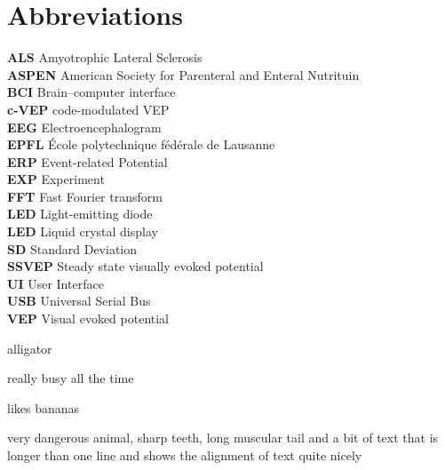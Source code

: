 \chapter{Abbreviations}
\textbf{ALS} Amyotrophic Lateral Sclerosis\\
\textbf{ASPEN}	American Society for Parenteral and Enteral Nutrituin\\
\textbf{BCI}	Brain–computer interface\\
\textbf{c-VEP}	code-modulated VEP\\
\textbf{EEG}	Electroencephalogram\\
\textbf{EPFL}	École polytechnique fédérale de Lausanne\\
\textbf{ERP}	Event-related Potential\\
\textbf{EXP}	Experiment\\
\textbf{FFT}	Fast Fourier transform\\
\textbf{LED}	Light-emitting diode\\
\textbf{LED}	Liquid crystal display\\
\textbf{SD}		Standard Deviation\\
\textbf{SSVEP}	Steady state visually evoked potential\\
\textbf{UI}		User Interface\\
\textbf{USB}		Universal Serial Bus\\
\textbf{VEP}		Visual evoked potential\\
\begin{labeling}{alligator}
	\item [ant] really busy all the time
	\item [chimp] likes bananas
	\item [alligator] very dangerous animal, sharp teeth, long
	muscular tail and a bit of text that is longer than one
	line and shows the alignment of text quite nicely
\end{labeling}